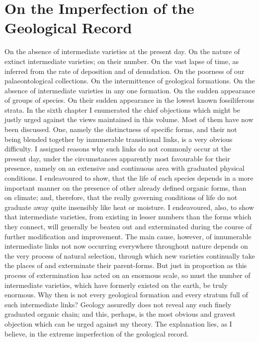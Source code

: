 \chapter{On the Imperfection of the Geological Record}
On the absence of intermediate varieties at the present day. On the nature of extinct intermediate varieties; on their number. On the vast lapse of time, as inferred from the rate of deposition and of denudation. On the poorness of our palaeontological collections. On the intermittence of geological formations. On the absence of intermediate varieties in any one formation. On the sudden appearance of groups of species. On their sudden appearance in the lowest known fossiliferous strata.
In the sixth chapter I enumerated the chief objections which might be justly urged against the views maintained in this volume. Most of them have now been discussed. One, namely the distinctness of specific forms, and their not being blended together by innumerable transitional links, is a very obvious difficulty. I assigned reasons why such links do not commonly occur at the present day, under the circumstances apparently most favourable for their presence, namely on an extensive and continuous area with graduated physical conditions. I endeavoured to show, that the life of each species depends in a more important manner on the presence of other already defined organic forms, than on climate; and, therefore, that the really governing conditions of life do not graduate away quite insensibly like heat or moisture. I endeavoured, also, to show that intermediate varieties, from existing in lesser numbers than the forms which they connect, will generally be beaten out and exterminated during the course of further modification and improvement. The main cause, however, of innumerable intermediate links not now occurring everywhere throughout nature depends on the very process of natural selection, through which new varieties continually take the places of and exterminate their parent-forms. But just in proportion as this process of extermination has acted on an enormous scale, so must the number of intermediate varieties, which have formerly existed on the earth, be truly enormous. Why then is not every geological formation and every stratum full of such intermediate links? Geology assuredly does not reveal any such finely graduated organic chain; and this, perhaps, is the most obvious and gravest objection which can be urged against my theory. The explanation lies, as I believe, in the extreme imperfection of the geological record.
